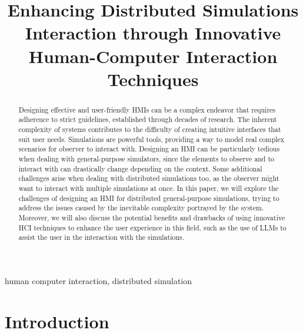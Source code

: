 \documentclass[conference]{IEEEtran}
\begin{document}
\title{Enhancing Distributed Simulations Interaction through Innovative Human-Computer Interaction Techniques\\
}

\author{
}

\maketitle

\begin{abstract}
    Designing effective and user-friendly \acp{HMI} can be a complex endeavor that requires adherence to strict guidelines,
    established through decades of research.
    The inherent complexity of systems contributes to the difficulty of creating intuitive interfaces that suit user needs.
    Simulations are powerful tools,
    providing a way to model real complex scenarios for observer to interact with.
    Designing an \ac{HMI} can be particularly tedious when dealing with general-purpose simulators,
    since the elements to observe and to interact with can drastically change depending on the context.
    Some additional challenges arise when dealing with distributed simulations too,
    as the observer might want to interact with multiple simulations at once.
    In this paper,
    we will explore the challenges of designing an \ac{HMI} for distributed general-purpose simulations,
    trying to address the issues caused by the inevitable complexity portrayed by the system.
    Moreover,
    we will also discuss the potential benefits and drawbacks of using innovative \ac{HCI} techniques to enhance the user experience in this field,
    such as the use of \acp{LLM} to assist the user in the interaction with the simulations.
\end{abstract}

\begin{IEEEkeywords}
    human computer interaction, distributed simulation
\end{IEEEkeywords}

\section{Introduction}
\end{document}
